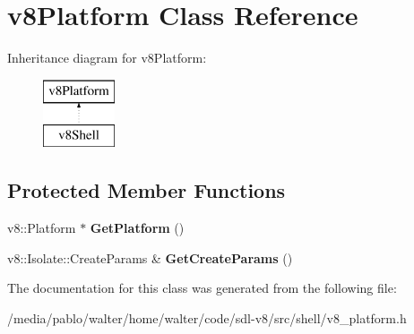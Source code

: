 \hypertarget{classv8Platform}{}\section{v8\+Platform Class Reference}
\label{classv8Platform}
Inheritance diagram for v8\+Platform\+:\begin{figure}[H]
\begin{center}
\leavevmode
\includegraphics[height=2.000000cm]{classv8Platform}
\end{center}
\end{figure}
\subsection*{Protected Member Functions}
\begin{DoxyCompactItemize}
\item 
\mbox{\label{classv8Platform_a82cb9a06d8c70ea3efde92455d41eb6f}} 
v8\+::\+Platform $\ast$ {\bfseries Get\+Platform} ()
\item 
\mbox{\label{classv8Platform_a6800ef936608ddcfec9a58b0eaf8ceca}} 
v8\+::\+Isolate\+::\+Create\+Params \& {\bfseries Get\+Create\+Params} ()
\end{DoxyCompactItemize}


The documentation for this class was generated from the following file\+:\begin{DoxyCompactItemize}
\item 
/media/pablo/walter/home/walter/code/sdl-\/v8/src/shell/v8\+\_\+platform.\+h\end{DoxyCompactItemize}

